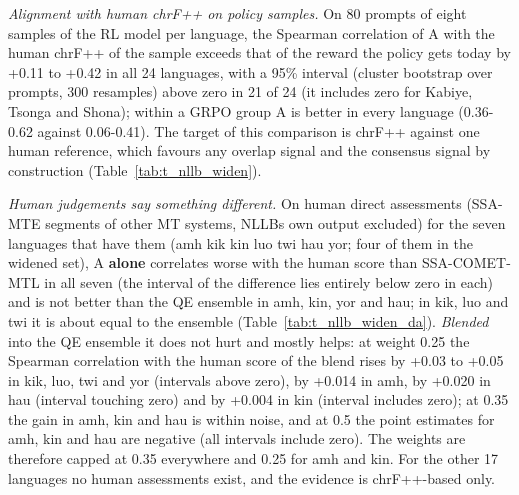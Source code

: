 \emph{Alignment with human chrF++ on policy samples.} On 80 prompts of eight samples of the RL model per language, the Spearman correlation of A with the human chrF++ of the sample exceeds that of the reward the policy gets today by +0.11 to +0.42 in all 24 languages, with a 95\% interval (cluster bootstrap over prompts, 300 resamples) above zero in 21 of 24 (it includes zero for Kabiye, Tsonga and Shona); within a GRPO group A is better in every language (0.36-0.62 against 0.06-0.41). The target of this comparison is chrF++ against one human reference, which favours any overlap signal and the consensus signal by construction (Table~\ref{tab:t_nllb_widen}).

\emph{Human judgements say something different.} On human direct assessments (SSA-MTE segments of other MT systems, NLLB\textquotesingle s own output excluded) for the seven languages that have them (amh kik kin luo twi hau yor; four of them in the widened set), A \textbf{alone} correlates worse with the human score than SSA-COMET-MTL in all seven (the interval of the difference lies entirely below zero in each) and is not better than the QE ensemble in amh, kin, yor and hau; in kik, luo and twi it is about equal to the ensemble (Table~\ref{tab:t_nllb_widen_da}). \emph{Blended} into the QE ensemble it does not hurt and mostly helps: at weight 0.25 the Spearman correlation with the human score of the blend rises by +0.03 to +0.05 in kik, luo, twi and yor (intervals above zero), by +0.014 in amh, by +0.020 in hau (interval touching zero) and by +0.004 in kin (interval includes zero); at 0.35 the gain in amh, kin and hau is within noise, and at 0.5 the point estimates for amh, kin and hau are negative (all intervals include zero). The weights are therefore capped at 0.35 everywhere and 0.25 for amh and kin. For the other 17 languages no human assessments exist, and the evidence is chrF++-based only.

